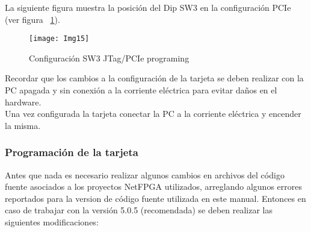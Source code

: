 La siguiente figura muestra la posición del Dip SW3 en la configuración PCIe (ver figura ~\ref{fig:Img15}).

\begin{figure}[htbp!] 
\centering    
\texttt{[image: Img15]}
\caption[Configuración SW3 JTag/PCIe programing]{Configuración SW3 JTag/PCIe programing}
\label{fig:Img15}
\end{figure}

Recordar que los cambios a la configuración de la tarjeta se deben realizar con la PC apagada y sin conexión a la corriente eléctrica para evitar daños en el hardware.\\

Una vez configurada la tarjeta conectar la PC a la corriente eléctrica y encender la misma.

\subsubsection{Programación de la tarjeta}
Antes que nada es necesario realizar algunos cambios en archivos del código fuente asociados a los proyectos NetFPGA utilizados, arreglando algunos errores reportados para la version de código fuente utilizada en este manual. Entonces en caso de trabajar con la versión 5.0.5 (recomendada) se deben realizar las siguientes modificaciones:

